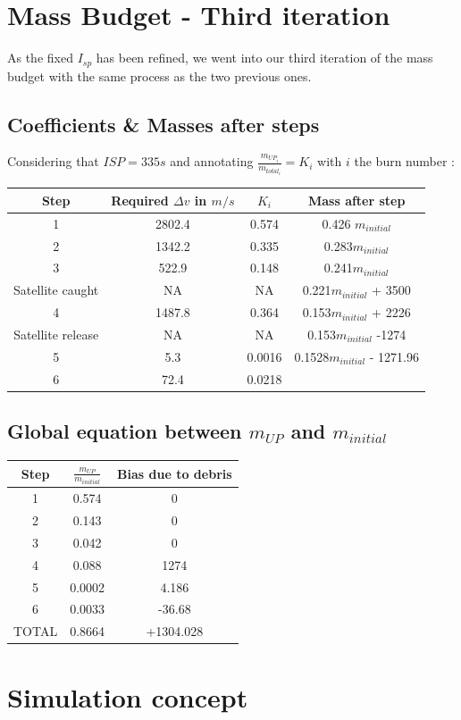 \section{Mass Budget - Third iteration}
As the fixed $I_{sp}$ has been refined, we went into our third iteration of the mass budget with the same process as the two previous ones.
\subsection{Coefficients \& Masses after steps}

Considering that \(ISP = 335s\) and annotating
\(\frac{m_{UP_i}}{m_{total_i}} = K_i\) with \(i\) the burn number :

\begin{longtable}[]{@{}cccc@{}}
\toprule
Step & Required \(\Delta v\) in \(m/s\) & \(K_i\) & Mass after
step\tabularnewline
\midrule
\endhead
1 & 2802.4 & 0.574 & 0.426 \(m_{initial}\)\tabularnewline
2 & 1342.2 & 0.335 & 0.283\(m_{initial}\)\tabularnewline
3 & 522.9 & 0.148 & 0.241\(m_{initial}\)\tabularnewline
Satellite caught & NA & NA & 0.221\(m_{initial}\) + 3500\tabularnewline
4 & 1487.8 & 0.364 & 0.153\(m_{initial}\) + 2226\tabularnewline
Satellite release & NA & NA & 0.153\(m_{initial}\) -1274\tabularnewline
5 & 5.3 & 0.0016 & 0.1528\(m_{initial}\) - 1271.96\tabularnewline
6 & 72.4 & 0.0218 &\tabularnewline
\bottomrule
\end{longtable}

\hypertarget{header-n470}{%
\subsection{\texorpdfstring{Global equation between \(m_{UP}\) and
		\(m_{initial}\)}{Global equation between m\_\{UP\} and m\_\{initial\}}}\label{header-n470}}



\begin{longtable}[]{@{}ccc@{}}
\toprule
Step & \(\frac{m_{UP}}{m_{initial}}\) & Bias due to
debris\tabularnewline
\midrule
\endhead
1 & 0.574 & 0\tabularnewline
2 & 0.143 & 0\tabularnewline
3 & 0.042 & 0\tabularnewline
4 & 0.088 & 1274\tabularnewline
5 & 0.0002 & 4.186\tabularnewline
6 & 0.0033 & -36.68\tabularnewline
TOTAL & 0.8664 & +1304.028\tabularnewline
\bottomrule
\end{longtable}
\section{Simulation concept}

